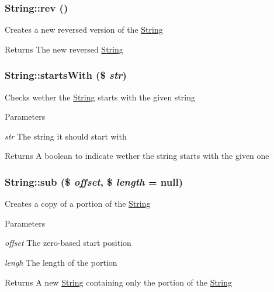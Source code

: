 \hypertarget{classString_a47b2739889b38abb582c4eee7d010f91}{
\subsubsection[{rev}]{\setlength{\rightskip}{0pt plus 5cm}String::rev ()}}
\label{classString_a47b2739889b38abb582c4eee7d010f91}
Creates a new reversed version of the \hyperlink{classString}{String} \begin{DoxyReturn}{Returns}
The new reversed \hyperlink{classString}{String} 
\end{DoxyReturn}
\hypertarget{classString_a0ab7fda4a4bc07fcc3ad0eb94cb96b22}{
\subsubsection[{startsWith}]{\setlength{\rightskip}{0pt plus 5cm}String::startsWith (\$ {\em str})}}
\label{classString_a0ab7fda4a4bc07fcc3ad0eb94cb96b22}
Checks wether the \hyperlink{classString}{String} starts with the given string 
\begin{DoxyParams}{Parameters}
\item[{\em str}]The string it should start with \end{DoxyParams}
\begin{DoxyReturn}{Returns}
A boolean to indicate wether the string starts with the given one 
\end{DoxyReturn}
\hypertarget{classString_a23eb86e0ad225b29dd3e02e637a42c37}{
\subsubsection[{sub}]{\setlength{\rightskip}{0pt plus 5cm}String::sub (\$ {\em offset}, \/  \$ {\em length} = {\ttfamily null})}}
\label{classString_a23eb86e0ad225b29dd3e02e637a42c37}
Creates a copy of a portion of the \hyperlink{classString}{String} 
\begin{DoxyParams}{Parameters}
\item[{\em offset}]The zero-\/based start position \item[{\em lengh}]The length of the portion \end{DoxyParams}
\begin{DoxyReturn}{Returns}
A new \hyperlink{classString}{String} containing only the portion of the \hyperlink{classString}{String} 
\end{DoxyReturn}
